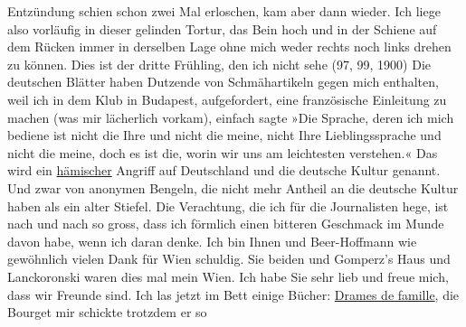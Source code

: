 \begin{ledgroupsized}[t]{13cm}
               Entzündung schien schon zwei Mal erloschen, kam aber dann wieder. Ich liege also
               vorläufig in dieser gelinden Tortur, das Bein hoch und in der Schiene {\pb}auf dem Rücken immer in derselben
               Lage ohne mich weder rechts noch links drehen zu können.\pend
           \pstart
           Dies ist der dritte Frühling, den ich nicht sehe (97, 99,
                  1900)\pend
           \pstart
           Die deutschen Blätter haben Dutzende von Schmähartikeln gegen mich enthalten, weil
               ich in dem Klub in Budapest,
               aufgefordert, eine französische Einleitung zu
               machen (was mir lächerlich vorkam), einfach sagte »Die Sprache, deren ich mich
               bediene ist nicht die Ihre und nicht die meine, nicht Ihre Lieblingssprache und nicht
               die meine, doch es ist die, worin wir uns am leichtesten verstehen.« Das wird ein \uline{hämischer} Angriff auf Deutschland und die deutsche Kultur genannt. Und zwar von anonymen Bengeln,
               die nicht mehr Antheil an die deutsche Kultur haben als ein alter Stiefel. Die Verachtung, die ich für die Journalisten {\pb}hege, ist nach und nach so gross,
               dass ich förmlich einen bitteren Geschmack im Munde davon habe, wenn ich daran
               denke.\pend
           \pstart
           Ich bin Ihnen und Beer-Hoffmann wie gewöhnlich
               vielen Dank für Wien schuldig.\pend
           \pstart
           Sie beiden und Gomperz’s Haus und Lanckoronski waren dies mal mein Wien. Ich habe Sie sehr lieb und freue mich, dass
               wir Freunde sind.\pend
           \pstart
           Ich las jetzt im Bett einige Bücher: \uline{Drames de famille}, die Bourget mir schickte trotzdem er so

\end{ledgroupsized}
